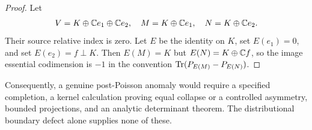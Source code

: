 \begin{proof}
Let
\[
  V=K\oplus\mathbb{C} e_1\oplus\mathbb{C} e_2,
  \quad M=K\oplus\mathbb{C} e_1,
  \quad N=K\oplus\mathbb{C} e_2.
\]
Their source relative index is zero.  Let \(E\) be the identity on \(K\),
set \(E(e_1)=0\), and set \(E(e_2)=f\perp K\).  Then
\(E(M)=K\) but \(E(N)=K\oplus\mathbb{C} f\), so the image essential codimension is
\(-1\) in the convention \(\operatorname{Tr}(P_{E(M)}-P_{E(N)})\).
\end{proof}

Consequently, a genuine post-Poisson anomaly would require a specified
completion, a kernel calculation proving equal collapse or a controlled
asymmetry, bounded projections, and an analytic determinant theorem.  The
distributional boundary defect alone supplies none of these.
